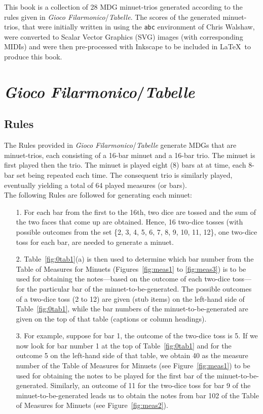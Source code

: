 \documentclass[a4paper,x11names,svgnames,10pt]{article}
\begin{document}
{This book is a collection of 28 MDG minuet-trios generated according to the rules given in {\it Gioco Filarmonico}/{\it Tabelle}.  The scores of the generated minuet-trios, that were initially written in using the \texttt{abc} environment of Chris Walshaw, were converted to Scalar Vector Graphics (SVG) images (with corresponding MIDIs) and were then pre-processed with Inkscape to be included in \LaTeX\ to produce this book.


\section{{\em Gioco Filarmonico}/{\em Tabelle}}

\subsection{Rules}

The Rules provided in {\em Gioco Filarmonico}/{\em Tabelle} generate MDGs that are minuet-trios, each consisting of a 16-bar minuet and a 16-bar trio.  The minuet is first played then the trio. The minuet is played eight (8)  bars at at time, each 8-bar set being repeated each time.  The consequent trio is similarly played, eventually yielding a total of 64 played measures (or bars). \\

The following Rules are followed for generating each minuet:
\begin{enumerate}
	\item [1.] For each bar from the first to the 16th, two dice are tossed and the sum of the two faces that come up are obtained.  Hence, 16 two-dice tosses (with possible outcomes from the set \{2, 3, 4, 5, 6, 7, 8, 9, 10, 11, 12\}, one two-dice toss for each bar, are needed to generate a minuet.   
	\item [2.] Table~\ref{fig:0tab1}(a) is then used to determine which bar number from the Table of Measures for Minuets (Figures~\ref{fig:meas1} to \ref{fig:meas3}) is to be used for obtaining the notes---based on the outcome of each two-dice toss---for the particular bar of the minuet-to-be-generated.  The possible outcomes of a two-dice toss (2 to 12) are given (stub items) on the left-hand side of Table~\ref{fig:0tab1}, while the bar numbers of the minuet-to-be-generated are given on the top of that table (captions or column  headings).
	\item [3.]  For example, suppose for bar 1, the outcome of the two-dice toss is 5.  If we now look for bar number 1 at the top of Table~\ref{fig:0tab1} and for the outcome 5 on the left-hand side of that table, we obtain 40 as the measure number of the Table of Measures for Minuets (see Figure~\ref{fig:meas1}) to be used for obtaining the notes to be played for the first bar of the minuet-to-be-generated.  Similarly, an outcome of 11 for the two-dice toss for bar 9 of the minuet-to-be-generated leads us to obtain the notes from bar 102 of the Table of Measures for Minuets (see Figure~\ref{fig:meas2}).
\end{enumerate}   

}
\end{document}
